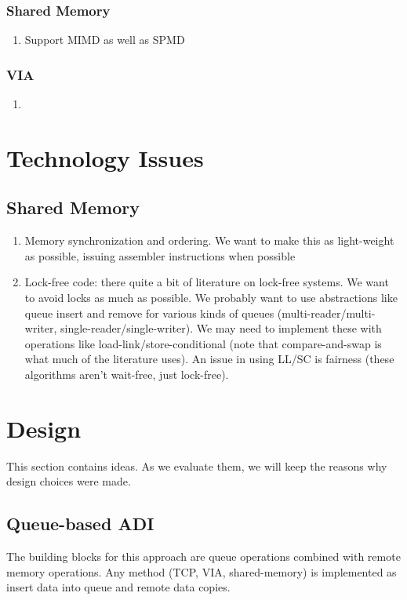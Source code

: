 \documentclass{article}
\begin{document}
\subsubsection{Shared Memory}
\begin{enumerate}
\item Support MIMD as well as SPMD
\end{enumerate}

\subsubsection{VIA}
\begin{enumerate}
\item 
\end{enumerate}

\section{Technology Issues}

\subsection{Shared Memory}
\begin{enumerate}
\item Memory synchronization and ordering.  We want to make this as
  light-weight as possible, issuing assembler instructions when possible
\item Lock-free code: there quite a bit of literature on lock-free systems.
  We want to avoid locks as much as possible.  We probably want to use
  abstractions like queue insert and remove for various kinds of queues
  (multi-reader/multi-writer, single-reader/single-writer).  We may need to
  implement these with operations like load-link/store-conditional (note that
  compare-and-swap is what much of the literature uses).  An issue in using
  LL/SC is fairness (these algorithms aren't wait-free, just lock-free).
\end{enumerate}

\section{Design}

This section contains ideas.  As we evaluate them, we will keep the reasons
why design choices were made.

\subsection{Queue-based ADI}
The building blocks for this approach are queue operations combined with
remote memory operations.  Any method (TCP, VIA, shared-memory) is implemented
as insert data into queue and remote data copies.
\end{document}
